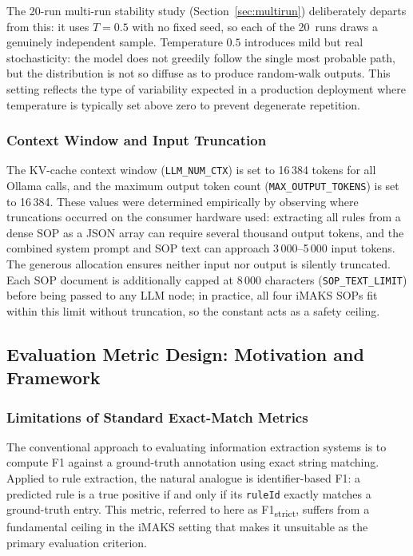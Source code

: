 ﻿\documentclass[11pt]{article}
\begin{document}
The 20-run multi-run stability study (Section~\ref{sec:multirun}) deliberately
departs from this: it uses $T = 0.5$ with no fixed seed, so each of the 20~runs
draws a genuinely independent sample.
Temperature $0.5$ introduces mild but real stochasticity: the model does not
greedily follow the single most probable path, but the distribution is not so
diffuse as to produce random-walk outputs.
This setting reflects the type of variability expected in a production deployment
where temperature is typically set above zero to prevent degenerate repetition.

\subsubsection{Context Window and Input Truncation}
The KV-cache context window (\texttt{LLM\_NUM\_CTX}) is set to 16\,384 tokens
for all Ollama calls, and the maximum output token count
(\texttt{MAX\_OUTPUT\_TOKENS}) is set to 16\,384.
These values were determined empirically by observing where truncations occurred
on the consumer hardware used: extracting all rules from a dense SOP as a JSON
array can require several thousand output tokens, and the combined system prompt
and SOP text can approach 3\,000--5\,000 input tokens.
The generous allocation ensures neither input nor output is silently truncated.
Each SOP document is additionally capped at 8\,000 characters
(\texttt{SOP\_TEXT\_LIMIT}) before being passed to any LLM node; in practice,
all four iMAKS SOPs fit within this limit without truncation, so the constant
acts as a safety ceiling.

\subsection{Evaluation Metric Design: Motivation and Framework}
\label{sec:metric_design_overview}

\subsubsection{Limitations of Standard Exact-Match Metrics}
\label{sec:eval_limitations}

The conventional approach to evaluating information extraction systems is to
compute F1 against a ground-truth annotation using exact string matching.
Applied to rule extraction, the natural analogue is identifier-based F1:
a predicted rule is a true positive if and only if its \texttt{ruleId} exactly
matches a ground-truth entry.
This metric, referred to here as F1\textsubscript{strict}, suffers from a
fundamental ceiling in the iMAKS setting that makes it unsuitable as the
primary evaluation criterion.
\end{document}
